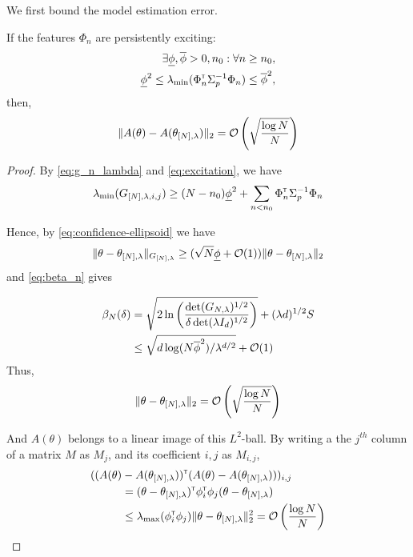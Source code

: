 \documentclass{article}
\begin{document}
We first bound the model estimation error.
\begin{lemma}
If the features $\Phi_n$ are persistently exciting:
\begin{align}
\label{eq:excitation}
\exists \underline{\phi},\overline{\phi}>0, n_0: \forall n\geq n_0,\nonumber\\ \underline{\phi}^2 \leq \lambda_{\min}(\Phi_{n}^{\mathsf{\scriptscriptstyle T}}\Sigma_{p}^{-1}\Phi_{n}) \leq \overline{\phi}^2,
\end{align}
then,
\[\|A(\theta) - A(\theta_{[N],\lambda})\|_2 = \mathcal{O}\left( \sqrt{\frac{\log N}{N}} \right) \]
\end{lemma}
\begin{proof}
By \eqref{eq:g_n_lambda} and \eqref{eq:excitation}, we have $$\lambda_{\min}(G_{[N],\lambda,i,j}) \geq (N-n_0)\underline{\phi}^2 + \sum_{n<n_0}\Phi_{n}^{\mathsf{\scriptscriptstyle T}}\Sigma_{p}^{-1}\Phi_{n}$$

Hence, by \eqref{eq:confidence-ellipsoid} we have 
\begin{align*}
	\|\theta - \theta_{[N],\lambda}\|_{G_{[N],\lambda}} \geq (\sqrt{N}\underline{\phi} + \mathcal{O}(1))\|\theta - \theta_{[N],\lambda}\|_{2}
\end{align*}
and \eqref{eq:beta_n} gives

\begin{align*}
\beta_N(\delta) &= \sqrt{2\ln \left(\frac{\det(G_{N,\lambda})^{1/2}}{\delta\det(\lambda I_d)^{1/2}}\right)}
+ (\lambda d)^{1/2}S\\
&\leq \sqrt{d\log (N\overline{\phi}^2) / \lambda^{d/2}} + \mathcal{O}(1)
\end{align*}
Thus,
\[\|\theta - \theta_{[N],\lambda}\|_{2} = \mathcal{O}\left( \sqrt{\frac{\log N}{N}} \right) \]

And $A(\theta)$ belongs to a linear image of this $L^2$-ball. By writing a the $j^{th}$ column of a matrix $M$ as $M_j$, and its coefficient $i,j$ as $M_{i,j}$,
\begin{align*}
((A(\theta)&-A(\theta_{[N],\lambda}))^{\mathsf{\scriptscriptstyle T}} (A(\theta) - A(\theta_{[N],\lambda})))_{i,j}\\
&= (\theta-\theta_{[N],\lambda})^{\mathsf{\scriptscriptstyle T}}\phi_{i}^{\mathsf{\scriptscriptstyle T}}\phi_j(\theta-\theta_{[N],\lambda}) \\
&\leq \lambda_{\max}(\phi_{i}^{\mathsf{\scriptscriptstyle T}}\phi_j) \|\theta - \theta_{[N],\lambda}\|_{2}^2 = \mathcal{O}\left( {\frac{\log N}{N}} \right) 
\end{align*}

\end{proof}
\end{document}
